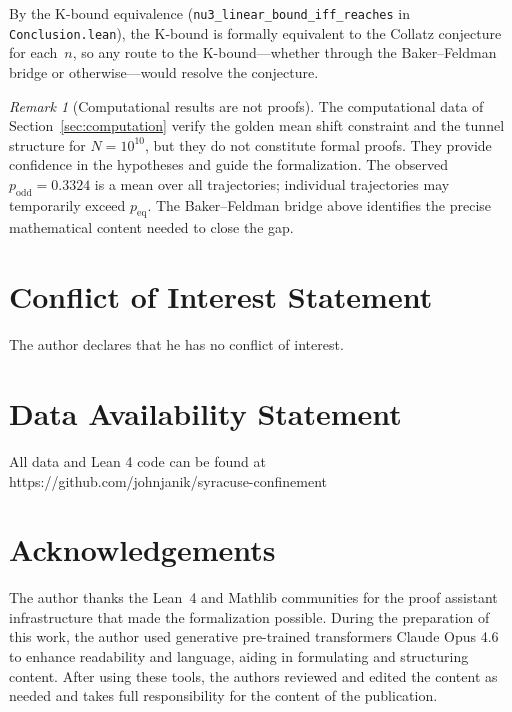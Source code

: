 \documentclass[manuscript]{aomart}
\theoremstyle{plain}
\theoremstyle{definition}
\theoremstyle{remark}
\newtheorem{remark}[theorem]{Remark}
\numberwithin{equation}{section}
\begin{document}
By the K-bound equivalence (\texttt{nu3\_linear\_bound\_iff\_reaches}
in \texttt{Conclusion.lean}), the K-bound is formally equivalent to the
Collatz conjecture for each~$n$, so any route to the K-bound---whether
through the Baker--Feldman bridge or otherwise---would resolve the
conjecture.

\begin{remark}[Computational results are not proofs]
\label{rem:not-proof}
The computational data of Section~\ref{sec:computation} verify the
golden mean shift constraint and the tunnel structure for
$N = 10^{10}$, but they do not constitute formal proofs.  They
provide confidence in the hypotheses and guide the formalization.
The observed $p_{\mathrm{odd}} = 0.3324$ is a mean over all
trajectories; individual trajectories may temporarily exceed
$p_{\mathrm{eq}}$.  The Baker--Feldman bridge above identifies the
precise mathematical content needed to close the gap.
\end{remark}

\section*{Conflict of Interest Statement}
The author declares that he has no conflict of interest.

\section*{Data Availability Statement}
All data and Lean 4 code can be found at https://github.com/johnjanik/syracuse-confinement


\section*{Acknowledgements}

The author thanks the Lean~4 and Mathlib communities for the proof
assistant infrastructure that made the formalization possible. During the preparation of this work,
the author used generative pre-trained transformers Claude Opus 4.6 to enhance readability and language,
aiding in formulating and structuring content. After using these tools, the authors reviewed and edited
the content as needed and takes full responsibility for the content of the publication.
\end{document}
